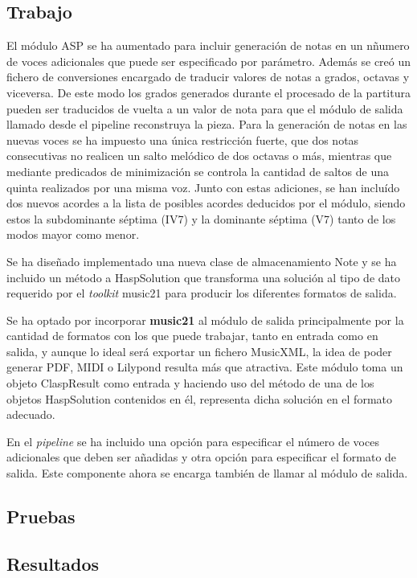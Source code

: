 \subsection{Trabajo}
El módulo ASP se ha aumentado para incluir generación de notas en un nñumero de voces adicionales que puede ser especificado por parámetro. Además se creó un fichero de conversiones encargado de traducir valores de notas a grados, octavas y viceversa. De este modo los grados generados durante el procesado de la partitura pueden ser traducidos de vuelta a un valor de nota para que el módulo de salida llamado desde el pipeline reconstruya la pieza. Para la generación de notas en las nuevas voces se ha impuesto una única restricción fuerte, que dos notas consecutivas no realicen un salto melódico de dos octavas o más, mientras que mediante predicados de minimización se controla la cantidad de saltos de una quinta realizados por una misma voz. Junto con estas adiciones, se han incluído dos nuevos acordes a la lista de posibles acordes deducidos por el módulo, siendo estos la subdominante séptima (IV7) y la dominante séptima (V7) tanto de los modos mayor como menor.

Se ha diseñado implementado una nueva clase de almacenamiento Note y se ha incluido un método a HaspSolution que transforma una solución al tipo de dato requerido por el \textit{toolkit} music21 para producir los diferentes formatos de salida.

Se ha optado por incorporar \textbf{music21} al módulo de salida principalmente por la cantidad de formatos con los que puede trabajar, tanto en entrada como en salida, y aunque lo ideal será exportar un fichero MusicXML, la idea de poder generar PDF, MIDI o Lilypond resulta más que atractiva. Este módulo toma un objeto ClaspResult como entrada y haciendo uso del método de una de los objetos HaspSolution contenidos en él, representa dicha solución en el formato adecuado.

En el \textit{pipeline} se ha incluido una opción para especificar el número de voces adicionales que deben ser añadidas y otra opción para especificar el formato de salida. Este componente ahora se encarga también de llamar al módulo de salida.

\subsection{Pruebas}

\subsection{Resultados}

